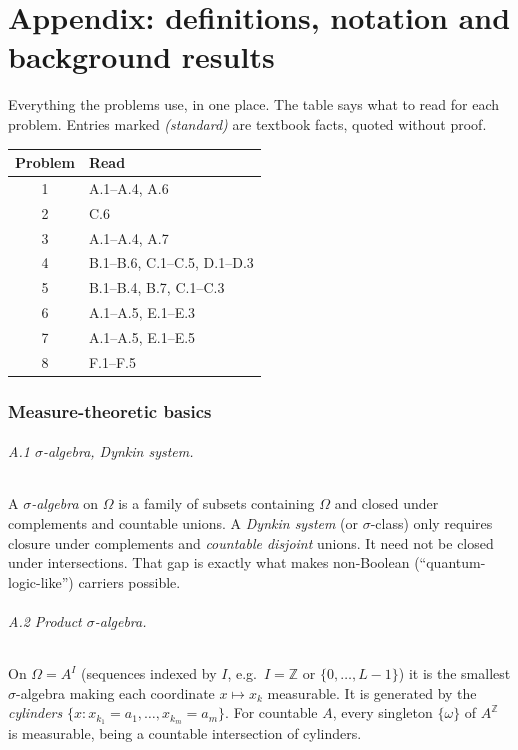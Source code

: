 \documentclass[11pt]{article}
\theoremstyle{definition}
\theoremstyle{remark}
\newcommand{\bbZ}{\mathbb{Z}}
\begin{document}
\newpage
\appendix
\part{Appendix: definitions, notation and background results}

Everything the problems use, in one place. The table says what to read for each
problem. Entries marked \emph{(standard)} are textbook facts, quoted without
proof.

\medskip
\begin{center}
\begin{tabular}{cl}
\textbf{Problem} & \textbf{Read} \\ \hline
1 & A.1--A.4, A.6 \\
2 & C.6 \\
3 & A.1--A.4, A.7 \\
4 & B.1--B.6, C.1--C.5, D.1--D.3 \\
5 & B.1--B.4, B.7, C.1--C.3 \\
6 & A.1--A.5, E.1--E.3 \\
7 & A.1--A.5, E.1--E.5 \\
8 & F.1--F.5 \\
\end{tabular}
\end{center}

\section{Measure-theoretic basics}

\paragraph{A.1 $\sigma$-algebra, Dynkin system.} A \emph{$\sigma$-algebra} on
$\Omega$ is a family of subsets containing $\Omega$ and closed under complements
and countable unions. A \emph{Dynkin system} (or $\sigma$-class) only requires
closure under complements and \emph{countable disjoint} unions. It need not be
closed under intersections. That gap is exactly what makes non-Boolean
(``quantum-logic-like'') carriers possible.

\paragraph{A.2 Product $\sigma$-algebra.} On $\Omega=A^{I}$ (sequences indexed by
$I$, e.g.\ $I=\bbZ$ or $\{0,\dots,L-1\}$) it is the smallest $\sigma$-algebra
making each coordinate $x\mapsto x_k$ measurable. It is generated by the
\emph{cylinders} $\{x: x_{k_1}=a_1,\dots,x_{k_m}=a_m\}$. For countable $A$, every
singleton $\{\omega\}$ of $A^{\bbZ}$ is measurable, being a countable intersection
of cylinders.
\end{document}
